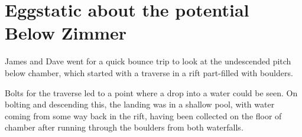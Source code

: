 \section{Eggstatic about the potential Below Zimmer}


James and Dave went for a quick bounce trip to look at the undescended
pitch below  chamber, which started with a traverse in a
rift part-filled with boulders.

Bolts for the traverse led to a point where a drop into a water could be
seen. On bolting and descending this, the landing was in a shallow pool,
with water coming from some way back in the rift, having been collected
on the floor of  chamber after running through the boulders
from both waterfalls.


